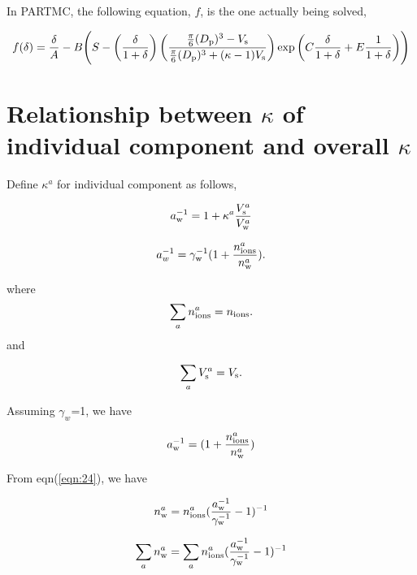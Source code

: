 \documentclass[12pt]{article}
\begin{document}
In PARTMC, the following equation, $f$, is the one actually being solved,

\begin{equation}\label{eqn:22b}
f(\delta)=\frac{\delta}{A}-B \Bigg(S-\left(\frac{\delta}{1+\delta}\right) \left(\frac{\frac{\pi}{6}(D_{\rm p})^{3}-V_{\rm s}} {\frac{\pi}{6}(D_{\rm p})^{3}+(\kappa-1)V_{\rm s}}\right)\exp{\left(C \frac{\delta}{1+\delta} +E \frac{1}{1+\delta}\right)} \Bigg)
\end{equation}

\section{Relationship between $\kappa$ of individual component and overall $\kappa$}

Define $\kappa^{a}$ for individual component as follows, 

\begin{equation}\label{eqn:23}
a_{\rm w}^{-1}=1+\kappa^{a} \frac{V_{\rm s}^{a}}{V_{\rm w}^{a}} 
\end{equation}

\begin{equation}\label{eqn:24}
a_{w}^{-1}=\gamma_{\rm w}^{-1} (1+\frac{n_{\rm ions}^{a}}{n_{\rm w}^{a}}).
\end{equation}

where
\begin{equation}\label{eqn:25}
\sum_{a} n_{\rm ions}^{a}=n_{\rm ions}.
\end{equation}
 and 
 
\begin{equation}\label{eqn:25}
\sum_{a} V_{\rm s}^{a}=V_{\rm s}.
\end{equation}

Assuming $\gamma_{w}$=1, we have 

\begin{equation}\label{eqn:26}
a_{\rm w}^{-1}=(1+\frac{n_{\rm ions}^{a}}{n_{\rm w}^{a}})
\end{equation}

From eqn(\ref{eqn:24}), we have

\begin{equation}\label{eqn:27}
n_{\rm w}^{a}=n_{\rm ions}^{a}(\frac{a_{\rm w}^{-1}}{\gamma_{\rm w}^{-1}}-1)^{-1}
\end{equation}

\begin{equation}
\sum_{a} n_{\rm w}^{a}=\sum_{a}n_{\rm ions}^{a}(\frac{a_{\rm w}^{-1}}{\gamma_{\rm w}^{-1}}-1)^{-1}
\end{equation}
\end{document}

